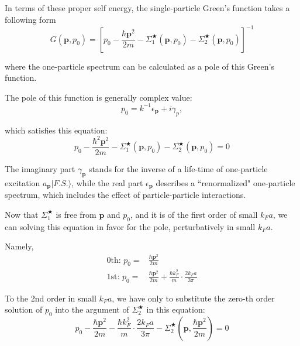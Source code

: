 In terms of these proper self energy, the single-particle Green's function takes a following form
\[ G(\mathbf{p},p_0) = \left[p_0-\frac{\hbar \mathbf{p}^2}{2m} - \Sigma_1^{\bigstar}(\mathbf{p},p_0)-\Sigma_2^{\bigstar}(\mathbf{p},p_0)\right]^{-1} \]

where the one-particle spectrum can be calculated as a pole of this Green's function.

The pole of this function is generally complex value:
\begin{equation} \label{Eqs2.7.30}
p_0 = k^{-1}\epsilon_{\mathbf{p}} +i \gamma_p,
\end{equation}

which satisfies this equation:
\begin{equation} \label{Eqs2.7.31}
p_0 - \frac{\hbar^2\mathbf{p}^2}{2m}-\Sigma_1^{\bigstar}(\mathbf{p},p_0)-\Sigma_2^{\bigstar}(\mathbf{p},p_0) = 0
\end{equation}

The imaginary part $\gamma_{\mathbf{p}}$ stands for the inverse of a life-time of one-particle excitation $a_{\mathbf{p}} |F.S.\rangle$, while the real part $\epsilon_{\mathbf{p}}$ describes a ``renormalized" one-particle spectrum, which includes the effect of particle-particle interactions.

Now that $\Sigma_1^{\bigstar}$ is free from $\mathbf{p}$ and $p_0$, and it is of the first order of small $k_F a$, we can solving this equation in favor for the pole, perturbatively in small $k_F a$.

Namely,
\[ \begin{split}
\text{0th: } p_0=&\frac{\hbar\mathbf{p}^2}{2m}\\
\text{1st: } p_0=&\frac{\hbar\mathbf{p}^2}{2m} + \frac{\hbar k_F^2}{m}\cdot\frac{2 k_F a}{3\pi}
\end{split} \]

To the 2nd order in small $k_F a$, we have only to substitute the zero-th order solution of $p_0$ into the argument of $\Sigma_2^{\bigstar}$ in this equation:
\[ p_0 - \frac{\hbar \mathbf{p}^2}{2m}-\frac{\hbar k_F^2}{m}\cdot\frac{2 k_F a}{3\pi} - \Sigma_2^{\bigstar}(\mathbf{p},\frac{\hbar \mathbf{p}^2}{2m}) = 0\]

